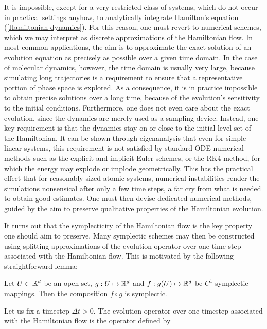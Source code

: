     It is impossible, except for a very restricted class of systems, which do not occur in practical settings anyhow, to analytically integrate Hamilton's equation (\ref{Hamiltonian dynamics}). For this reason, one must revert to numerical schemes, which we may interpret as discrete approximations of the Hamiltonian flow.
    In most common applications, the aim is to approximate the exact solution of an evolution equation as precisely as possible over a given time domain.
    In the case of molecular dynamics, however, the time domain is usually very large, because simulating long trajectories is a requirement to ensure that a representative portion of phase space is explored. As a consequence, it is in practice impossible to obtain precise solutions over a long time, because of the evolution's sensitivity to the initial conditions. 
    Furthermore, one does not even care about the exact evolution, since the dynamics are merely used as a sampling device. Instead, one key requirement is that the dynamics stay on or close to the initial level set of the Hamiltonian. It can be shown through eigenanalysis that even for simple linear systems, this requirement is not satisfied by standard ODE numerical methods such as the explicit and implicit Euler schemes, or the RK4 method, for which the energy may explode or implode geometrically.
    This has the practical effect that for reasonably sized atomic systems, numerical instabilities render the simulations nonsensical after only a few time steps, a far cry from what is needed to obtain good estimates.
    One must then devise dedicated numerical methods, guided by the aim to preserve qualitative properties of the Hamiltonian evolution.

    It turns out that the symplecticity of the Hamiltonian flow is the key property one should aim to preserve. Many symplectic schemes may then be constructed using splitting approximations of the evolution operator over one time step associated with the Hamiltonian flow. This is motivated by the following straightforward lemma:

    \begin{lemma}
        Let $U \subset \mathbb{R}^d$ be an open set, $g: U\mapsto \mathbb{R}^d$ and $f: g(U) \mapsto \mathbb{R}^d$ be $C^1$ symplectic mappings. Then the composition $f \circ g$ is symplectic.
    \end{lemma}

    Let us fix a timestep $\Delta t>0$. The evolution operator over one timestep associated with the Hamiltonian flow is the operator defined by

